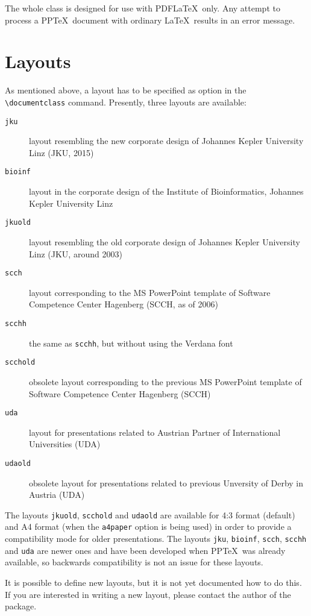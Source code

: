 \documentclass[twoside,a4paper,11pt]{article}
\def\PPTeX{{\upshape PP\TeX{}}}
\begin{document}
The whole class is designed for use\NOTE{} with PDF\LaTeX\ only. Any
attempt to process a \PPTeX\ document with ordinary \LaTeX\ results
in an error message.

\section{Layouts}

As mentioned above, a layout has to be specified as option in the
\verb+\documentclass+ command. Presently, three layouts are
available:
\begin{description}
\item[\texttt{jku}] layout resembling the new corporate design of
Johannes Kepler University Linz (JKU, 2015)
\item[\texttt{bioinf}] layout in the corporate design of the
Institute of Bioinformatics, Johannes Kepler University Linz
\item[\texttt{jkuold}] layout resembling the old corporate design of
Johannes Kepler University Linz (JKU, around 2003)
\item[\texttt{scch}] layout corresponding to the MS PowerPoint
template of Software Competence Center Hagenberg (SCCH, as of 2006)
\item[\texttt{scchh}] the same as \texttt{scchh}, but without using
the Verdana font
\item[\texttt{scchold}] obsolete layout corresponding to the previous MS PowerPoint
template of Software Competence Center Hagenberg (SCCH)
\item[\texttt{uda}] layout for presentations related to Austrian Partner of International Universities (UDA)
\item[\texttt{udaold}] obsolete layout for presentations related to previous Unversity of Derby in Austria (UDA)
\end{description}
The layouts \verb+jkuold+, \verb+scchold+ and \verb+udaold+ are
available for 4:3 format (default) and A4 format (when the
\verb+a4paper+ option is being used) in order to provide a
compatibility mode for older presentations. The layouts
\verb+jku+, \verb+bioinf+, \verb+scch+, \verb+scchh+  and \verb+uda+ are newer
ones and have been developed when \PPTeX\ was already available, so
backwards compatibility is not an issue for these layouts.

It is possible to define new layouts, but it is not yet documented
how to do this. If you are interested in writing a new layout,
please contact the author of the package.
\end{document}
